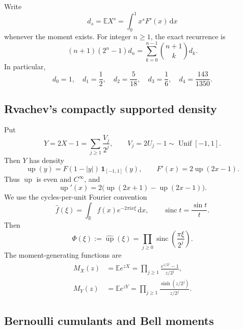 \documentclass[11pt,oneside]{article}
\theoremstyle{definition}
\theoremstyle{remark}
\newcommand{\F}{F}
\newcommand{\Up}{\operatorname{up}}
\newcommand{\E}{\mathbb E}
\newcommand{\R}{\mathbb R}
\newcommand{\dd}{\,\mathrm d}
\newcommand{\ii}{\mathrm i}
\newcommand{\sinc}{\operatorname{sinc}}
\begin{document}
Write
\begin{equation}
  d_s=\E X^s=\int_0^1 x^s\F'(x)\dd x
\end{equation}
whenever the moment exists.  For integer \(n\ge1\), the exact recurrence is
\begin{equation}\label{eq:momentrec}
 (n+1)(2^n-1)d_n=\sum_{k=0}^{n-1}\binom{n+1}{k}d_k.
\end{equation}
In particular,
\[
 d_0=1,
 \quad d_1=\frac12,
 \quad d_2=\frac5{18},
 \quad d_3=\frac16,
 \quad d_4=\frac{143}{1350}.
\]

\subsection{Rvachev's compactly supported density}

Put
\begin{equation}\label{eq:Ydef}
 Y=2X-1=\sum_{j\ge1}\frac{V_j}{2^j},
 \qquad V_j=2U_j-1\sim\operatorname{Unif}[-1,1].
\end{equation}
Then \(Y\) has density
\begin{equation}\label{eq:updef}
 \Up(y)=\F(1-|y|)\,\mathbf1_{[-1,1]}(y),
 \qquad
 \F'(x)=2\Up(2x-1).
\end{equation}
Thus \(\Up\) is even and \(C^\infty\), and
\begin{equation}\label{eq:uprefinement}
 \Up'(x)=2\bigl(\Up(2x+1)-\Up(2x-1)\bigr).
\end{equation}
We use the cycles-per-unit Fourier convention
\begin{equation}
 \widehat f(\xi)=\int_{\R}f(x)e^{-2\pi\ii x\xi}\dd x,
 \qquad \sinc t=\frac{\sin t}{t}.
\end{equation}
Then
\begin{equation}\label{eq:phi}
 \Phi(\xi):=\widehat{\Up}(\xi)
 =\prod_{j\ge0}\sinc\!\left(\frac{\pi\xi}{2^j}\right).
\end{equation}
The moment-generating functions are
\begin{align}
 M_X(z)&=\E e^{zX}
 =\prod_{j\ge1}\frac{e^{z/2^j}-1}{z/2^j},\label{eq:MX}\\
 M_Y(z)&=\E e^{zY}
 =\prod_{j\ge1}\frac{\sinh(z/2^j)}{z/2^j}.\label{eq:MY}
\end{align}

\subsection{Bernoulli cumulants and Bell moments}
\end{document}
